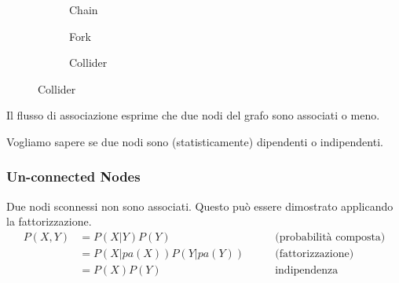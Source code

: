 \begin{figure}[h]
  \centering

  \begin{subfigure}[c]{0.34\linewidth}
    \centering
    \bigskip
    \bigskip
    \bigskip
    \caption{Chain}
  \end{subfigure}
  \begin{subfigure}[c]{0.32\linewidth}
    \centering
    \caption{Fork}
  \end{subfigure}
  \begin{subfigure}[c]{0.32\linewidth}
    \centering
    \caption{Collider}
  \end{subfigure}
\end{figure}

Il flusso di associazione esprime che due nodi del grafo sono associati o meno.

Vogliamo sapere se due nodi sono (statisticamente) dipendenti o indipendenti.

\subsubsection*{Un-connected Nodes}
Due nodi sconnessi non sono associati. Questo può essere dimostrato applicando la fattorizzazione.
%
\begin{align*}
  P(X, Y) & = P(X | Y) P(Y)             \qquad & \text{(probabilità composta)} \\
          & = P(X | pa(X)) P(Y | pa(Y)) \qquad & \text{(fattorizzazione)}      \\
          & = P(X) P(Y)                 \qquad & \text{indipendenza}
\end{align*}

